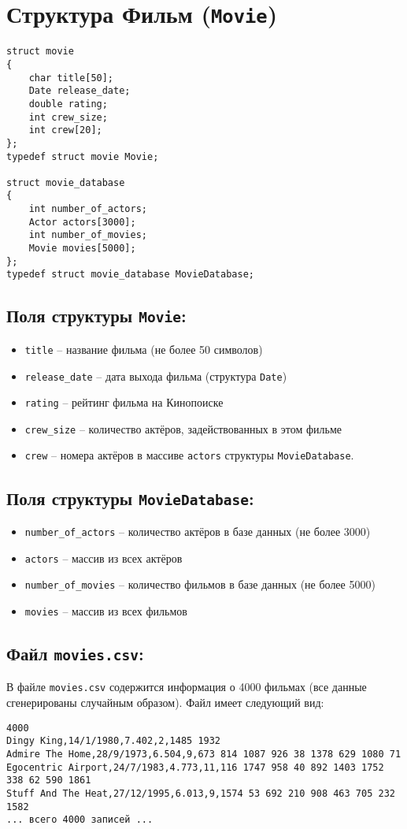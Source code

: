 \documentclass{article}
\begin{document}
\section*{Структура Фильм (\texttt{Movie})}
\begin{lstlisting}
struct movie 
{
	char title[50];
	Date release_date;
	double rating;
	int crew_size;
	int crew[20];
};
typedef struct movie Movie;

struct movie_database 
{
	int number_of_actors;
	Actor actors[3000];
	int number_of_movies;
	Movie movies[5000];
};
typedef struct movie_database MovieDatabase;
\end{lstlisting}

\subsection*{Поля структуры \texttt{Movie}:}
\begin{itemize}
\item \texttt{title} -- название фильма (не более 50 символов)
\item \texttt{release\_date} -- дата выхода фильма (структура \texttt{Date})
\item \texttt{rating} -- рейтинг фильма на Кинопоиске
\item \texttt{crew\_size} -- количество актёров, задействованных в этом фильме
\item \texttt{crew} -- номера актёров в массиве \texttt{actors} структуры \texttt{MovieDatabase}.
\end{itemize}
\subsection*{Поля структуры \texttt{MovieDatabase}:}
\begin{itemize}
\item \texttt{number\_of\_actors} -- количество актёров в базе данных (не более 3000)
\item \texttt{actors} -- массив из всех актёров
\item \texttt{number\_of\_movies} -- количество фильмов в базе данных (не более 5000)
\item \texttt{movies} -- массив из всех фильмов
\end{itemize}
\subsection*{Файл \texttt{movies.csv}:}
В файле \texttt{movies.csv} содержится информация о 4000 фильмах (все данные сгенерированы случайным образом). Файл имеет следующий вид:
\begin{verbatim}
4000
Dingy King,14/1/1980,7.402,2,1485 1932
Admire The Home,28/9/1973,6.504,9,673 814 1087 926 38 1378 629 1080 71
Egocentric Airport,24/7/1983,4.773,11,116 1747 958 40 892 1403 1752 338 62 590 1861
Stuff And The Heat,27/12/1995,6.013,9,1574 53 692 210 908 463 705 232 1582
... всего 4000 записей ...
\end{verbatim}
\end{document}
